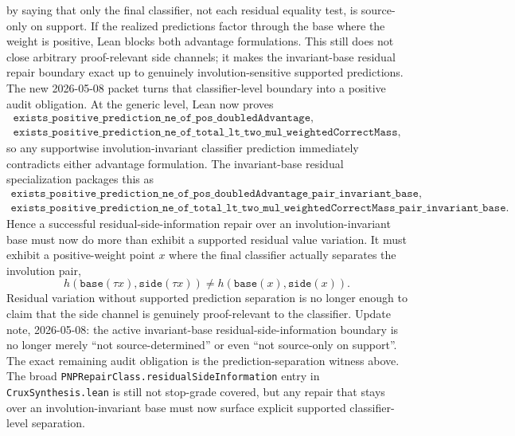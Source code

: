 \documentclass[11pt]{article}
\theoremstyle{remark}
\begin{document}
by saying that only the final classifier, not each residual equality test, is
source-only on support.  If the realized predictions factor through the base
where the weight is positive, Lean blocks both advantage formulations.  This
still does not close arbitrary proof-relevant side channels; it makes the
invariant-base residual repair boundary exact up to genuinely
involution-sensitive supported predictions.  The new 2026-05-08 packet turns
that classifier-level boundary into a positive audit obligation.  At the
generic level, Lean now proves
\[
\begin{gathered}
\texttt{exists\_positive\_prediction\_ne\_of\_pos\_doubledAdvantage},\\
\texttt{exists\_positive\_prediction\_ne\_of\_total\_lt\_two\_mul\_weightedCorrectMass},
\end{gathered}
\]
so any supportwise involution-invariant classifier prediction immediately
contradicts either advantage formulation.  The invariant-base residual
specialization packages this as
\[
\begin{gathered}
\texttt{exists\_positive\_prediction\_ne\_of\_pos\_doubledAdvantage\_pair\_invariant\_base},\\
\texttt{exists\_positive\_prediction\_ne\_of\_total\_lt\_two\_mul\_weightedCorrectMass\_pair\_invariant\_base}.
\end{gathered}
\]
Hence a successful residual-side-information repair over an involution-invariant
base must now do more than exhibit a supported residual value variation.  It
must exhibit a positive-weight point \(x\) where the final classifier actually
separates the involution pair,
\[
h(\texttt{base}(\tau x), \texttt{side}(\tau x))
  \ne h(\texttt{base}(x), \texttt{side}(x)).
\]
Residual variation without supported prediction separation is no longer enough
to claim that the side channel is genuinely proof-relevant to the classifier.
Update note, 2026-05-08: the active invariant-base residual-side-information
boundary is no longer merely ``not source-determined'' or even ``not
source-only on support''.  The exact remaining audit obligation is the
prediction-separation witness above.  The broad
\texttt{PNPRepairClass.residualSideInformation} entry in
\texttt{CruxSynthesis.lean} is still not stop-grade covered, but any repair
that stays over an involution-invariant base must now surface explicit
supported classifier-level separation.
\end{document}
